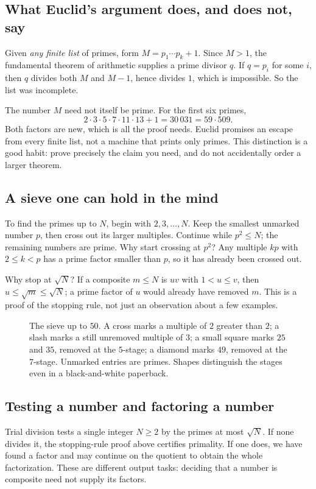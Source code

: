 \subsection*{What Euclid's argument does, and does not, say}
Given \emph{any finite list} of primes, form $M=p_1\cdots p_k+1$. Since $M>1$, the fundamental theorem of arithmetic supplies a prime divisor $q$. If $q=p_i$ for some $i$, then $q$ divides both $M$ and $M-1$, hence divides $1$, which is impossible. So the list was incomplete.

The number $M$ need not itself be prime. For the first six primes,
\[
2\cdot3\cdot5\cdot7\cdot11\cdot13+1
 =30\,031=59\cdot509.
\]
Both factors are new, which is all the proof needs. Euclid promises an escape from every finite list, not a machine that prints only primes. This distinction is a good habit: prove precisely the claim you need, and do not accidentally order a larger theorem.

\subsection*{A sieve one can hold in the mind}
To find the primes up to $N$, begin with $2,3,\ldots,N$. Keep the smallest unmarked number $p$, then cross out its larger multiples. Continue while $p^2\le N$; the remaining numbers are prime. Why start crossing at $p^2$? Any multiple $kp$ with $2\le k<p$ has a prime factor smaller than $p$, so it has already been crossed out.

Why stop at $\sqrt N$? If a composite $m\le N$ is $uv$ with $1<u\le v$, then $u\le\sqrt m\le\sqrt N$; a prime factor of $u$ would already have removed $m$. This is a proof of the stopping rule, not just an observation about a few examples.

\begin{figure}[ht]
\centering{}
\caption{The sieve up to $50$. A cross marks a multiple of $2$ greater than $2$; a slash marks a still unremoved multiple of $3$; a small square marks $25$ and $35$, removed at the $5$-stage; a diamond marks $49$, removed at the $7$-stage. Unmarked entries are primes. Shapes distinguish the stages even in a black-and-white paperback.}
\label{fig:sieve}
\end{figure}

\subsection*{Testing a number and factoring a number}
Trial division tests a single integer $N\ge2$ by the primes at most
$\sqrt N$. If none divides it, the stopping-rule proof above certifies
primality. If one does, we have found a factor and may continue on the quotient
to obtain the whole factorization. These are different output tasks: deciding
that a number is composite need not supply its factors.

